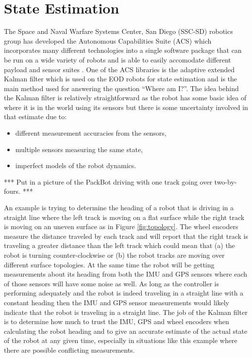 \chapter{State Estimation}
\label{ch:estimation}
The Space and Naval Warfare Systems Center, San Diego (SSC-SD) robotics group has developed the Autonomous Capabilities Suite (ACS) which incorporates many different technologies into a single software package that can be run on a wide variety of robots and is able to easily accomodate different payload and sensor suites \cite{Sights06}. One of the ACS libraries is the adaptive extended Kalman filter which is used on the EOD robots for state estimation and is the main method used for answering the question ``Where am I?''. The idea behind the Kalman filter is relatively straightforward as the robot has some basic idea of where it is in the world using its sensors but there is some uncertainty involved in that estimate due to:
\begin{itemize}
\item different measurement accuracies from the sensors,
\item multiple sensors measuring the same state,
\item imperfect models of the robot dynamics.
\end{itemize}

*** Put in a picture of the PackBot driving with one track going over two-by-fours. ***

An example is trying to determine the heading of a robot that is driving in a straight line where the left track is moving on a flat surface while the right track is moving on an uneven surface as in Figure \ref{fig:topology}. The wheel encoders measure the distance traveled by each track and will report that the right track is traveling a greater distance than the left track which could mean that (a) the robot is turning counter-clockwise or (b) the robot tracks are moving over different surface topologies. At the same time the robot will be getting measurements about its heading from both the IMU and GPS sensors where each of those sensors will have some noise as well. As long as the controller is performing adequately and the robot is indeed traveling in a straight line with a constant heading then the IMU and GPS sensor measurements would likely indicate that the robot is traveling in a straight line. The job of the Kalman filter is to determine how much to trust the IMU, GPS and wheel encoders when calculating the robot heading and to give an accurate estimate of the actual state of the robot at any given time, especially in situations like this example where there are possible conflicting measurements.

